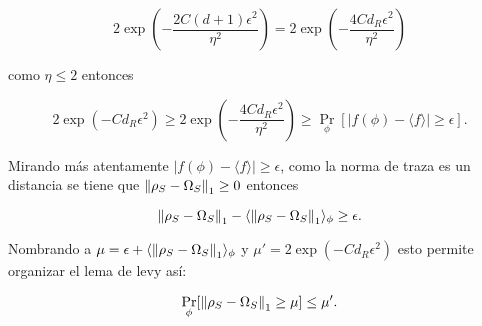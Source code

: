\begin{equation}
 2 \exp(-\frac{2C(d+1)\epsilon^2}{\eta^2})= 2 \exp(-\frac{4Cd_{R}\epsilon^2}{\eta^2})
\end{equation}

como $\eta \le 2$ entonces

\begin{equation} \label{desigualdad}
2\exp(-Cd_{R}\epsilon^2) \ge 2 \exp(-\frac{4Cd_{R}\epsilon^2}{\eta^2}) \ge \Pr_{\phi}[|f(\phi)- \langle f \rangle| \ge \epsilon ].
\end{equation}

Mirando más atentamente  $|f(\phi)- \langle f \rangle| \ge \epsilon $, como la norma de traza es un distancia se tiene que  $\norm{\rho_{S} -\Omega_{S}}_{1} \ge 0$ entonces


\begin{equation}
\norm{\rho_{S} -\Omega_{S}}_{1}- \langle \norm{\rho_{S} -\Omega_{S}}_{1} \rangle_{\phi} \ge \epsilon.
\end{equation}

Nombrando a $\mu = \epsilon + \langle \norm{\rho_{S} -\Omega_{S}}_{1} \rangle_{\phi} $ y $\mu'=2 \exp(-Cd_{R}\epsilon^2)$ esto permite organizar el lema de levy así:

\begin{equation} \label{eq.3}
\Pr_{\phi}[\norm{\rho_{S} -\Omega_{S}}_{1} \ge \mu] \le \mu'.
\end{equation}

